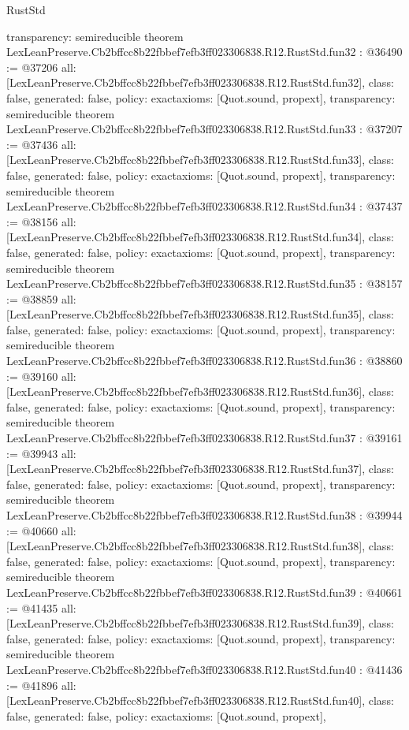 \begin{lexlean}{RustStd}
\begin{coremodule}
{  transparency: semireducible
}
theorem LexLeanPreserve.Cb2bffcc8b22fbbef7efb3ff023306838.R12.RustStd.fun32 : @36490 := @37206 {
  all: [LexLeanPreserve.Cb2bffcc8b22fbbef7efb3ff023306838.R12.RustStd.fun32],
  class: false,
  generated: false,
  policy: exact{axioms: [Quot.sound, propext]},
  transparency: semireducible
}
theorem LexLeanPreserve.Cb2bffcc8b22fbbef7efb3ff023306838.R12.RustStd.fun33 : @37207 := @37436 {
  all: [LexLeanPreserve.Cb2bffcc8b22fbbef7efb3ff023306838.R12.RustStd.fun33],
  class: false,
  generated: false,
  policy: exact{axioms: [Quot.sound, propext]},
  transparency: semireducible
}
theorem LexLeanPreserve.Cb2bffcc8b22fbbef7efb3ff023306838.R12.RustStd.fun34 : @37437 := @38156 {
  all: [LexLeanPreserve.Cb2bffcc8b22fbbef7efb3ff023306838.R12.RustStd.fun34],
  class: false,
  generated: false,
  policy: exact{axioms: [Quot.sound, propext]},
  transparency: semireducible
}
theorem LexLeanPreserve.Cb2bffcc8b22fbbef7efb3ff023306838.R12.RustStd.fun35 : @38157 := @38859 {
  all: [LexLeanPreserve.Cb2bffcc8b22fbbef7efb3ff023306838.R12.RustStd.fun35],
  class: false,
  generated: false,
  policy: exact{axioms: [Quot.sound, propext]},
  transparency: semireducible
}
theorem LexLeanPreserve.Cb2bffcc8b22fbbef7efb3ff023306838.R12.RustStd.fun36 : @38860 := @39160 {
  all: [LexLeanPreserve.Cb2bffcc8b22fbbef7efb3ff023306838.R12.RustStd.fun36],
  class: false,
  generated: false,
  policy: exact{axioms: [Quot.sound, propext]},
  transparency: semireducible
}
theorem LexLeanPreserve.Cb2bffcc8b22fbbef7efb3ff023306838.R12.RustStd.fun37 : @39161 := @39943 {
  all: [LexLeanPreserve.Cb2bffcc8b22fbbef7efb3ff023306838.R12.RustStd.fun37],
  class: false,
  generated: false,
  policy: exact{axioms: [Quot.sound, propext]},
  transparency: semireducible
}
theorem LexLeanPreserve.Cb2bffcc8b22fbbef7efb3ff023306838.R12.RustStd.fun38 : @39944 := @40660 {
  all: [LexLeanPreserve.Cb2bffcc8b22fbbef7efb3ff023306838.R12.RustStd.fun38],
  class: false,
  generated: false,
  policy: exact{axioms: [Quot.sound, propext]},
  transparency: semireducible
}
theorem LexLeanPreserve.Cb2bffcc8b22fbbef7efb3ff023306838.R12.RustStd.fun39 : @40661 := @41435 {
  all: [LexLeanPreserve.Cb2bffcc8b22fbbef7efb3ff023306838.R12.RustStd.fun39],
  class: false,
  generated: false,
  policy: exact{axioms: [Quot.sound, propext]},
  transparency: semireducible
}
theorem LexLeanPreserve.Cb2bffcc8b22fbbef7efb3ff023306838.R12.RustStd.fun40 : @41436 := @41896 {
  all: [LexLeanPreserve.Cb2bffcc8b22fbbef7efb3ff023306838.R12.RustStd.fun40],
  class: false,
  generated: false,
  policy: exact{axioms: [Quot.sound, propext]},
}
\end{coremodule}
\end{lexlean}
